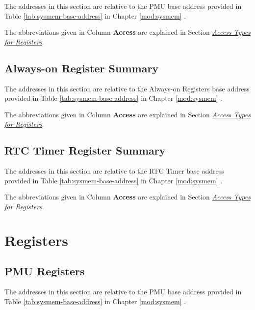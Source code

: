 \documentclass[main\_\_EN.tex]{subfiles}
\begin{document}
The addresses in this section are relative to the PMU base address provided in Table \ref{tab:sysmem-base-address} in Chapter \ref{mod:sysmem} \textit{}.

The abbreviations given in Column \textbf{Access} are explained in Section \hyperref[glossary-access-types]{\textit{Access Types for Registers}}.



\subsection{Always-on Register Summary}

The addresses in this section are relative to the Always-on Registers base address provided in Table \ref{tab:sysmem-base-address} in Chapter \ref{mod:sysmem} \textit{}.

The abbreviations given in Column \textbf{Access} are explained in Section \hyperref[glossary-access-types]{\textit{Access Types for Registers}}.



\subsection{RTC Timer Register Summary}

The addresses in this section are relative to the RTC Timer base address provided in Table \ref{tab:sysmem-base-address} in Chapter \ref{mod:sysmem} \textit{}.

The abbreviations given in Column \textbf{Access} are explained in Section \hyperref[glossary-access-types]{\textit{Access Types for Registers}}.



\clearpage
\section{Registers}

\subsection{PMU Registers}

The addresses in this section are relative to the PMU base address provided in Table \ref{tab:sysmem-base-address} in Chapter \ref{mod:sysmem} \textit{}.
\end{document}
